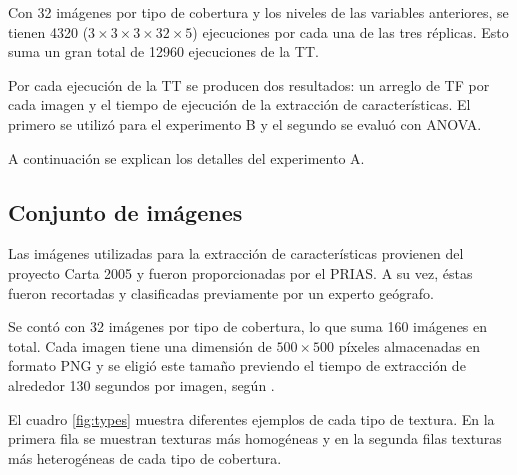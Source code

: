 Con 32 imágenes por tipo de cobertura y los niveles de las variables anteriores, se tienen 4320 ($3\times3\times3\times32\times5$) ejecuciones por cada una de las tres réplicas. Esto suma un gran total de 12960 ejecuciones de la TT.

Por cada ejecución de la TT se producen dos resultados: un arreglo de TF por cada imagen y el tiempo de ejecución de la extracción de características. El primero se utilizó para el experimento B y el segundo se evaluó con ANOVA.

A continuación se explican los detalles del experimento A.

\subsection{Conjunto de imágenes}

Las imágenes utilizadas para la extracción de características provienen del proyecto Carta 2005\cite{CARTA} y fueron proporcionadas por el PRIAS. A su vez, éstas fueron recortadas y clasificadas previamente por un experto geógrafo. 

Se contó con 32 imágenes por tipo de cobertura, lo que suma 160 imágenes en total. Cada imagen tiene una dimensión de $500 \times 500$ píxeles almacenadas en formato PNG y se eligió este tamaño previendo el tiempo de extracción de alrededor 130 segundos por imagen, según \cite{Garita2013}.

El cuadro \ref{fig:types} muestra diferentes ejemplos de cada tipo de textura. En la primera fila se muestran texturas más homogéneas y en la segunda filas texturas más heterogéneas de cada tipo de cobertura.

